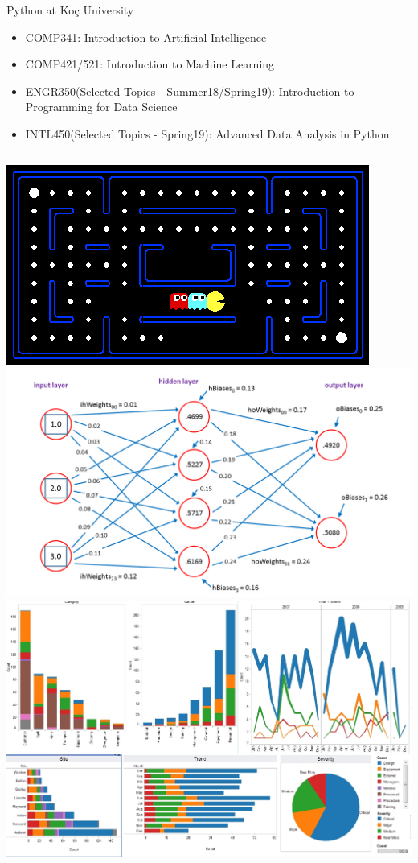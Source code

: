 	\begin{frame}{Python at Koç University}
		\begin{itemize}
			\LARGE
			\item COMP341: Introduction to Artificial Intelligence
			\pause
			\item COMP421/521: Introduction to Machine Learning
			\pause
			\item ENGR350(Selected Topics - Summer18/Spring19): Introduction to Programming for Data Science
			\pause  
			\item INTL450(Selected Topics - Spring19): Advanced Data Analysis in Python
			\pause
		\end{itemize}
		\begin{columns}
				\includegraphics[width=\textwidth]{images/berkeley_pacman.png}
			\pause
				\includegraphics[width=\textwidth]{images/nn.jpg}
			\pause
				\includegraphics[width=\textwidth]{images/analysis.jpeg}

\end{columns}
\end{frame}
